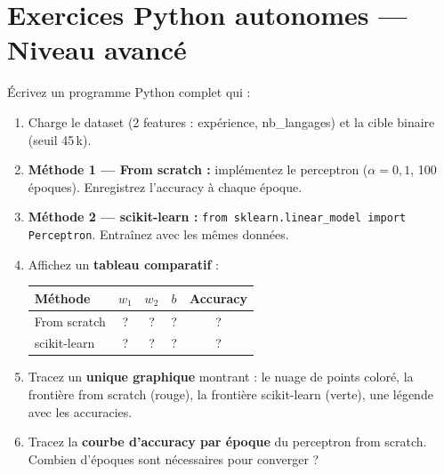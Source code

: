 \section*{Exercices Python autonomes --- Niveau avanc\'{e}}


\'{E}crivez un programme Python complet qui :

\begin{enumerate}[label=\alph*)]
    \item Charge le dataset (2 features : exp\'{e}rience, nb\_langages) et la cible binaire (seuil 45\,k\texteuro).

    \item \textbf{M\'{e}thode 1 --- From scratch :} impl\'{e}mentez le perceptron
        ($\alpha = 0{,}1$, 100 \'{e}poques). Enregistrez l'accuracy \`{a} chaque \'{e}poque.

    \item \textbf{M\'{e}thode 2 --- scikit-learn :}
        \texttt{from sklearn.linear\_model import Perceptron}.
        Entra\^{i}nez avec les m\^{e}mes donn\'{e}es.

    \item Affichez un \textbf{tableau comparatif} :
    \begin{center}
    \renewcommand{\arraystretch}{1.2}
    \begin{tabular}{l|c|c|c|c}
        \toprule
        \textbf{M\'{e}thode} & $w_1$ & $w_2$ & $b$ & Accuracy \\
        \midrule
        From scratch & ? & ? & ? & ? \\
        scikit-learn & ? & ? & ? & ? \\
        \bottomrule
    \end{tabular}
    \end{center}

    \item Tracez un \textbf{unique graphique} montrant :
        le nuage de points color\'{e}, la fronti\`{e}re from scratch (rouge),
        la fronti\`{e}re scikit-learn (verte), une l\'{e}gende avec les accuracies.

    \item Tracez la \textbf{courbe d'accuracy par \'{e}poque} du perceptron from scratch.
        Combien d'\'{e}poques sont n\'{e}cessaires pour converger ?
\end{enumerate}

